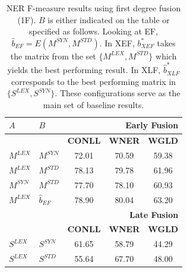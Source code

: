 \documentclass{llncs}
\newcommand\msyn{M^{\scriptscriptstyle SYN}}
\newcommand\mstd{M^{\scriptscriptstyle STD}}
\begin{document}
\begin{table}[!tb]
\centering
\setlength\tabcolsep{2pt}
\begin{minipage}[t]{0.48\textwidth}
\centering

\caption{NER F-measure results using first degree fusion (1F). $B$ is either indicated on the table or specified as follows. Looking at EF,  $\hat{b}_{EF} = E(\msyn, \mstd)$. In XEF, ${b}^*_{\scriptscriptstyle XEF}$ takes the matrix from the set $\{M^{\scriptscriptstyle LEX}, M^{\scriptscriptstyle STD} \}$ which yields the best performing result. In XLF, $\hat{b}_{\scriptscriptstyle XLF}^{*}$ corresponds to the best performing matrix in $\{S^{\scriptscriptstyle LEX},S^{\scriptscriptstyle SYN}\}$. These configurations serve as the main set of baseline results.}
\label{tab:ner-1d}
\centering
\begin{tabular}{@{}llccc@{}}
\toprule
    $A$      &    $B$       & \multicolumn{3}{r}{\textbf{Early Fusion} }                                            \\ \midrule
          &           & \textbf{CONLL}                      & \textbf{WNER}                      & \textbf{WGLD}                      \\ \cmidrule{3-5}
$M^{\scriptscriptstyle LEX}$ & $M^{\scriptscriptstyle SYN}$ & 72.01                      & 70.59                     & 59.38                     \\
$M^{\scriptscriptstyle LEX}$ & $M^{\scriptscriptstyle STD}$ & 78.13                      & 79.78                     & 61.96                     \\
$M^{\scriptscriptstyle SYN}$ & $M^{\scriptscriptstyle STD}$ & 77.70                      & 78.10                     & 60.93                     \\
$M^{\scriptscriptstyle LEX}$ & $\hat{b}_{EF}$ & 78.90                      & 80.04                     & 63.20                     \\
\midrule
          &           & \multicolumn{3}{r}{\textbf{Late Fusion} }                                             \\
\midrule     
          &           & \textbf{CONLL}                      & \textbf{WNER}                      & \textbf{WGLD}                      \\ \cmidrule{3-5}
$S^{\scriptscriptstyle LEX}$ & $S^{\scriptscriptstyle SYN}$ & 61.65                      & 58.79                     & 44.29                     \\
$S^{\scriptscriptstyle LEX}$ & $S^{\scriptscriptstyle STD}$ & 55.64                      & 67.70                     & 48.00                     \\

\end{tabular}
\end{minipage}
\end{table}
\end{document}
